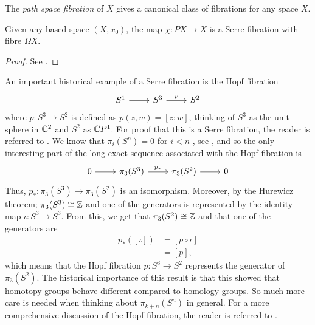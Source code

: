 \documentclass[../main.tex]{subfiles}
\begin{document}
The \emph{path space fibration} of \( X \) gives a canonical class of
fibrations for any space \( X \).

\begin{proposition}
   Given any based space \( (X,x_0) \), the map \( \chi:PX\rightarrow X \) is a
   Serre fibration with fibre \( \Omega X \).
\end{proposition}
\begin{proof}
   See \cite[]{Felix}.
\end{proof}

\begin{example}
\label{ex:hopf}
An important historical example of a Serre fibration is the Hopf fibration
\begin{equation}
\label{eq:hopf}
\begin{tikzcd}
	{S^1} & {S^3} & {S^2}
	\arrow[from=1-1, to=1-2]
	\arrow["p", from=1-2, to=1-3]
\end{tikzcd}
\end{equation}
where \( p:S^3 \rightarrow S^2 \) is defined as \( p(z, w)=[z:w] \), 
thinking of \( S^3 \) as the unit sphere in \( \mathbb{C}^2 \) and \( S^2 \) as
\( \mathbb{C} P^1 \). For proof that this is a Serre fibration, the reader is
referred to \cite[]{Hat02}. We know that \( \pi_i(S^n)=0 \) for \( i<n \)
, see \cite[]{Hat02}, and so the only interesting part of the long
exact sequence associated with the Hopf fibration is
\begin{equation}
   \begin{tikzcd}
       0 & {\pi_3(S^3)} & {\pi_3(S^2)} & 0
       \arrow[from=1-1, to=1-2]
       \arrow["{p_*}", from=1-2, to=1-3]
       \arrow[from=1-3, to=1-4]
   \end{tikzcd}
\end{equation}
Thus, \( p_*:\pi_3(S^3)\rightarrow \pi_3(S^2) \) is an
isomorphism. Moreover, by the Hurewicz theorem; \( \pi_3(S^3)\cong\mathbb{Z} \) and
one of the generators is represented by the identity map \( \iota:
S^3\rightarrow S^3\). From this, we get that \( \pi_3(S^2)\cong\mathbb{Z} \) and
that one of the generators are
\begin{align*}
   p_*([\iota]) &= [p\circ \iota] \\
                &= [p],
\end{align*}
which means that the Hopf fibration \( p:S^3\rightarrow S^2 \) represents
the generator of \( \pi_3(S^2) \). The historical importance of this
result is that this showed that homotopy groups behave different compared
to homology groups. So much more care is needed when thinking about
\( \pi_{k+n}(S^n) \) in general. For a more comprehensive discussion
of the Hopf fibration, the reader is referred to \cite[]{Lyo03}.
\end{example}
\end{document}
